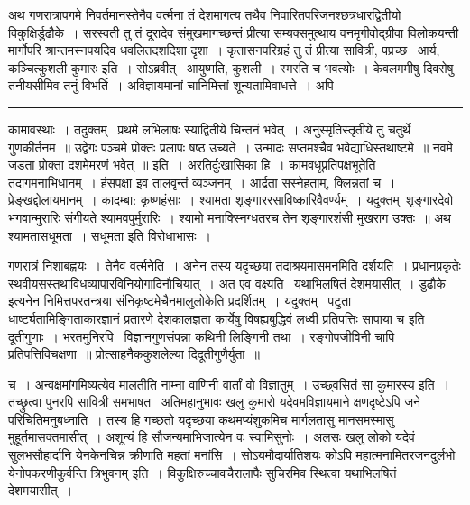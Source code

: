 \documentclass[11pt, openany]{book}
\begin{document}
अथ गणरात्रापगमे निवर्तमानस्तेनैव वर्त्मना तं देशमागत्य तथैव निवारितपरिजनश्छत्रधारद्वितीयो विकुक्षिर्डुढौके~। सरस्वती तु तं दूरादेव संमुखमागच्छन्तं प्रीत्या सम्यक्समुत्थाय वनमृगीवोद्ग्रीवा विलोकयन्ती मार्गोपरि श्रान्तमस्नपयदिव धवलितदशदिशा दृशा~। कृतासनपरिग्रहं तु तं प्रीत्या सावित्री, पप्रच्छ \textendash\ {\haq आर्य, कञ्चित्कुशली कुमारः} इति~। सोऽब्रवीत् \textendash\ आयुष्मति, कुशली~। स्मरति च भवत्योः~। केवलममीषु दिवसेषु तनीयसीमिव तनुं विभर्ति~। अविज्ञायमानां चानिमित्तां शून्यतामिवाधत्ते~। अपि

\vspace{2mm}
\hrule

\noindent
{\s कामावस्थाः~। तदुक्तम् \textendash\ {\qt प्रथमे लभिलाषः स्याद्वितीये चिन्तनं भवेत्~। अनुस्मृतिस्तृतीये तु चतुर्थे गुणकीर्तनम~॥ उद्वेगः पञ्चमे प्रोक्तः प्रलापः षष्ठ उच्यते~। उन्मादः सप्तमश्चैव भवेद्याधिस्तथाष्टमे~॥ नवमे जडता प्रोक्ता दशमेमरणं भवेत्~॥} इति~। अरतिर्दुःखासिका हि~। कामवधूप्रतिपक्षभूतेति तदागमनाभिधानम्~। हंसपक्षा इव तालवृन्तं व्यञ्जनम्~। आर्द्रता सस्नेहताम्, क्लिन्नतां च~। प्रेङ्खद्दोलायमानम्~। कादम्बा: कृष्णहंसाः~। श्यामता शृङ्गाररसाविष्कारिवैवर्ण्यम्~। यदुक्तम्\textendash\ {\qt शृङ्गारदेवो भगवान्मुरारिः संगीयते श्यामवपुर्मुरारिः~। श्यामो मनाक्स्निग्धतरच तेन शृङ्गारशंसी मुखराग उक्तः~॥} अथ श्यामतासधूमता~। सधूमता इति विरोधाभासः~।

गणरात्रं निशाबह्वयः~। {\qtt तेनैव वर्त्मनेति}~। अनेन तस्य यदृच्छया तदाश्रयमासमनमिति दर्शयति~। प्रधानप्रकृतेः स्थवीयसस्तथाविधव्यापारविनियोगादिनौचियात्~। अत एव वक्ष्यति \textendash\ {\qt यथाभिलषितं देशमयासीत्}~। डुढौके इत्यनेन निमित्तपरतन्त्रया संनिकृष्टमेचैनमालुलोकेति प्रदर्शितम्~। यदुक्तम् \textendash\ {\qt पटुता धार्ष्ट्यतामिङ्गिताकारज्ञानं प्रतारणे देशकालज्ञता कार्येषु विषह्यबुद्धिवं लध्वी प्रतिपत्तिः सापाया च इति दूतीगुणाः}~। भरतमुनिरपि \textendash\ {\qt विज्ञानगुणसंपन्ना कथिनी लिङ्गिनी तथा~। रङ्गोपजीविनी चापि प्रतिपत्तिविचक्षणा~॥ प्रोत्साहनैककुशलेल्या दिदूतीगुणैर्युता~॥}}

\newpage

\noindent
च~। अन्वक्षमांगमिष्यत्येव मालतीति नाम्ना वाणिनी वार्तां वो विज्ञातुम्~। उच्छ्वसितं सा कुमारस्य इति~। तच्छ्रुत्वा पुनरपि सावित्री समभाषत \textendash\ अतिमहानुभावः खलु कुमारो यदेवमविज्ञायमाने क्षणदृष्टेऽपि जने परिचितिमनुबध्नाति~। तस्य हि गच्छतो यदृच्छया कथमप्यंशुकमिच मार्गलतासु मानसमस्मासु मुहूर्तमासक्तमासीत्~। अशून्यं हि सौजन्यमाभिजात्येन वः स्वामिसुनोः~। अलसः खलु लोको यदेवं सुलभसौहार्दानि येनकेनचिन्न क्रीणाति महतां मनांसि~। सोऽयमौदार्यातिशयः कोऽपि महात्मनामितरजनदुर्लभो येनोपकरणीकुर्वन्ति त्रिभुवनम् इति~। विकुक्षिरुच्चावचैरालापैः सुचिरमिव स्थित्वा यथाभिलषितं देशमयासीत्~।
\end{document}
